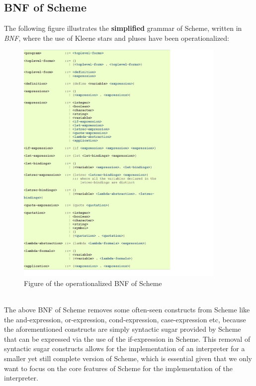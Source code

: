 \subsection{BNF of Scheme}
The following figure illustrates the \textbf{simplified} grammar of Scheme, written in \textit{BNF}, where the use of Kleene stars and pluses have been operationalized:
\\
\begin{figure}[!h]
  \centering
    \includegraphics[width=0.9\textwidth]{figures_progress_report/bnf.png}
  \caption{Figure of the operationalized BNF of Scheme}
  \label{fig:bnf}
\end{figure}
\\
The above BNF of Scheme removes some often-seen constructs from Scheme like the and-expression, or-expression, cond-expression, case-expression etc, because the aforementioned constructs are simply syntactic sugar provided by Scheme 
that can be expressed via the use of the if-expression in Scheme. This removal of syntactic sugar constructs allows for the implementation of an interpreter for a smaller yet still complete version of Scheme, which is essential 
given that we only want to focus on the core features of Scheme for the implementation of the interpreter.
\\
